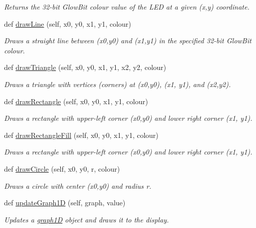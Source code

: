 \begin{DoxyCompactItemize}
\begin{DoxyCompactList}\small\item\em Returns the 32-\/bit Glow\+Bit colour value of the L\+ED at a given (x,y) coordinate. \end{DoxyCompactList}\item 
def \hyperlink{classglowbit_1_1glowbitMatrix_a373a7739051a7399a94636375ac0b4ec}{draw\+Line} (self, x0, y0, x1, y1, colour)
\begin{DoxyCompactList}\small\item\em Draws a straight line between (x0,y0) and (x1,y1) in the specified 32-\/bit Glow\+Bit colour. \end{DoxyCompactList}\item 
def \hyperlink{classglowbit_1_1glowbitMatrix_ac0b08486a62b6bd9c8633287d2725f43}{draw\+Triangle} (self, x0, y0, x1, y1, x2, y2, colour)
\begin{DoxyCompactList}\small\item\em Draws a triangle with vertices (corners) at (x0,y0), (x1, y1), and (x2,y2). \end{DoxyCompactList}\item 
def \hyperlink{classglowbit_1_1glowbitMatrix_ad70235a976475054af4ccb534a32b5e7}{draw\+Rectangle} (self, x0, y0, x1, y1, colour)
\begin{DoxyCompactList}\small\item\em Draws a rectangle with upper-\/left corner (x0,y0) and lower right corner (x1, y1). \end{DoxyCompactList}\item 
def \hyperlink{classglowbit_1_1glowbitMatrix_ad91952585c61527ae5c0ac4a170435bf}{draw\+Rectangle\+Fill} (self, x0, y0, x1, y1, colour)
\begin{DoxyCompactList}\small\item\em Draws a rectangle with upper-\/left corner (x0,y0) and lower right corner (x1, y1). \end{DoxyCompactList}\item 
def \hyperlink{classglowbit_1_1glowbitMatrix_a4efec5ce17c30403505b1f2775022e90}{draw\+Circle} (self, x0, y0, r, colour)
\begin{DoxyCompactList}\small\item\em Draws a circle with center (x0,y0) and radius r. \end{DoxyCompactList}\item 
def \hyperlink{classglowbit_1_1glowbitMatrix_a0d44976cdc12728d9ae80c2d901029c0}{update\+Graph1D} (self, graph, value)
\begin{DoxyCompactList}\small\item\em Updates a \hyperlink{classglowbit_1_1glowbitMatrix_1_1graph1D}{graph1D} object and draws it to the display. \end{DoxyCompactList}\item 

\end{DoxyCompactItemize}
